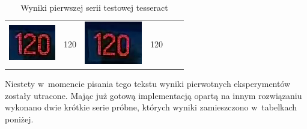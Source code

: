 \begin{table}[h!]
\begin{tabular}{c l c l c l}
\begin{minipage}{.2\textwidth}
      \includegraphics[width=\textwidth]{img/exp_number_06}
    \end{minipage}
    &
    120
    &
    \begin{minipage}{.2\textwidth}
      \includegraphics[width=\textwidth]{img/exp_number_07}
    \end{minipage}
    &
    120
    \\ 
  \end{tabular}
  \caption{Wyniki pierwszej serii testowej tesseract}\label{tbl:tess_01}
\end{table}

Niestety w~momencie pisania tego tekstu wyniki pierwotnych eksperymentów
zostały utracone. Mając już gotową implementacją opartą na innym
rozwiązaniu wykonano dwie krótkie serie próbne, których wyniki
zamieszczono w~tabelkach poniżej.

